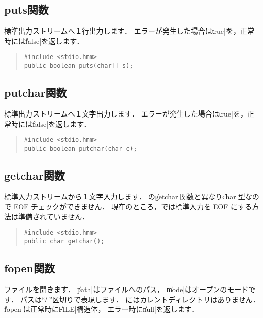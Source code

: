 \subsection{puts関数}

標準出力ストリームへ１行出力します．
エラーが発生した場合は\|true|を，正常時には\|false|を返します．

\begin{quote}
\begin{verbatim}
#include <stdio.hmm>
public boolean puts(char[] s);
\end{verbatim}
\end{quote}

\subsection{putchar関数}

標準出力ストリームへ１文字出力します．
エラーが発生した場合は\|true|を，正常時には\|false|を返します．

\begin{quote}
\begin{verbatim}
#include <stdio.hmm>
public boolean putchar(char c);
\end{verbatim}
\end{quote}

\subsection{getchar関数}

標準入力ストリームから１文字入力します．
\cl の\|getchar|関数と異なり\|char|型なので EOF チェックができません．
現在のところ，\tacos では標準入力を EOF にする方法は準備されていません．

\begin{quote}
\begin{verbatim}
#include <stdio.hmm>
public char getchar();
\end{verbatim}
\end{quote}

\subsection{fopen関数}

ファイルを開きます．
\|path|はファイルへのパス，
\|mode|はオープンのモードです．
パスは``\|/|''区切りで表現します．
\tacos にはカレントディレクトリはありません．
\|fopen|は正常時に\|FILE|構造体，
エラー時に\|null|を返します．

